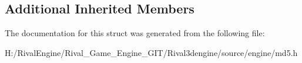 \subsection*{Additional Inherited Members}


The documentation for this struct was generated from the following file\+:\begin{DoxyCompactItemize}
\item 
H\+:/\+Rival\+Engine/\+Rival\+\_\+\+Game\+\_\+\+Engine\+\_\+\+G\+I\+T/\+Rival3dengine/source/engine/md5.\+h\end{DoxyCompactItemize}
